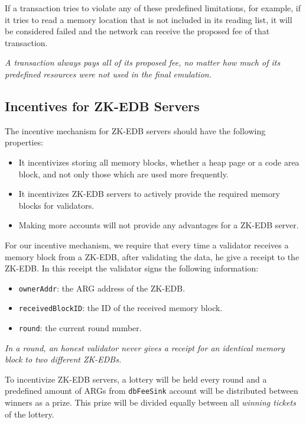 \documentclass[a4paper]{report}
\newcommand{\note}[1] {
    \begin{tcolorbox}[colframe=white,colback=white]
        \emph{#1}
    \end{tcolorbox}
}
\begin{document}
    If a transaction tries to violate any of these predefined limitations, for example, if it tries to read a memory
    location that is not included in its reading list, it will be considered failed and the network can receive the
    proposed fee of that transaction.

    \note{A transaction always pays all of its proposed fee, no matter how much of its predefined resources were not
    used in the final emulation.}

    \subsection{Incentives for ZK-EDB Servers}\label{subsec:zk-edb-servers}

    The incentive mechanism for ZK-EDB servers should have the following properties:

    \begin{itemize}
        \item It incentivizes storing all memory blocks, whether a heap page or a code area block, and not only those
        which are used more frequently.
        \item It incentivizes ZK-EDB servers to actively provide the required memory blocks for validators.
        \item Making more accounts will not provide any advantages for a ZK-EDB server.
    \end{itemize}

    For our incentive mechanism, we require that every time a validator receives a memory block from a ZK-EDB, after
    validating the data, he give a receipt to the ZK-EDB. In this receipt the validator signs the following information:

    \begin{itemize}
        \item \texttt{ownerAddr}: the ARG address of the ZK-EDB\@.
        \item \texttt{receivedBlockID}: the ID of the received memory block.
        \item \texttt{round}: the current round number.
    \end{itemize}

    \note{In a round, an honest validator never gives a receipt for an identical memory block to two different ZK-EDBs.}

    To incentivize ZK-EDB servers, a lottery will be held every round and a predefined amount of ARGs from
    \texttt{dbFeeSink} account will be distributed between winners as a prize. This prize will be divided equally
    between all \emph{winning tickets} of the lottery.
\end{document}

